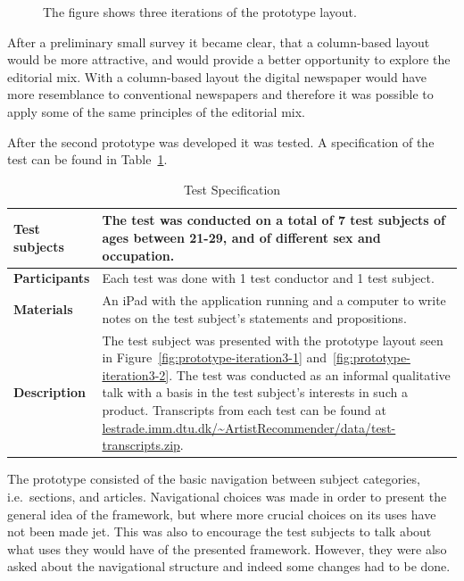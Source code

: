 \begin{figure}
{}
\caption{The figure shows three iterations of the prototype layout.}%
\label{fig:prototype-iterations}%
\end{figure}

After a preliminary small survey it became clear, that a column-based layout would be more attractive, and would provide a better opportunity to explore the editorial mix. With a column-based layout the digital newspaper would have more resemblance to conventional newspapers and therefore it was possible to apply some of the same principles of the editorial mix.

After the second prototype was developed it was tested. A specification of the test can be found in Table~\ref{tab:test-description}.

\begin{table}[h!tp]
	\caption{Test Specification}
	\label{tab:test-description}
	\myfloatalign
		\begin{tabularx}{\textwidth}{p{}|p{}}
		\toprule
			\textbf{Test subjects} & The test was conducted on a total of 7 test subjects of ages between 21-29, and of different sex and occupation.\\
		\midrule
			\textbf{Participants} & Each test was done with 1 test conductor and 1 test subject.\\
		\midrule
			\textbf{Materials} & An iPad with the application running and a computer to write notes on the test subject's statements and propositions.\\
		\midrule
			\textbf{Description} & The test subject was presented with the prototype layout seen in Figure~\ref{fig:prototype-iteration3-1} and~\ref{fig:prototype-iteration3-2}. The test was conducted as an informal qualitative talk with a basis in the test subject's interests in such a product. Transcripts from each test can be found at \url{lestrade.imm.dtu.dk/~ArtistRecommender/data/test-transcripts.zip}.\\
		\bottomrule
		\end{tabularx}
\end{table}

The prototype consisted of the basic navigation between subject categories, i.e.\ sections, and articles. Navigational choices was made in order to present the general idea of the framework, but where more crucial choices on its uses have not been made jet. This was also to encourage the test subjects to talk about what uses they would have of the presented framework. However, they were also asked about the navigational structure and indeed some changes had to be done.

